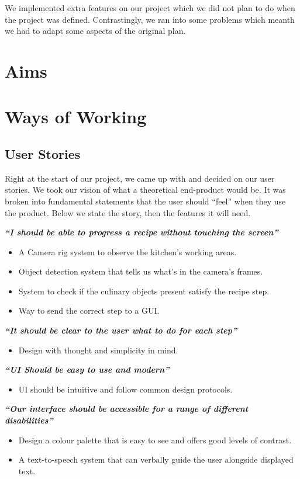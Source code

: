 \documentclass{article}
\begin{document}
We implemented extra features on our project which we did not plan to do when the project was defined. Contrastingly, we ran into some problems which meanth we had to adapt some aspects of the original plan.

    

    \section{Aims}

    \section{Ways of Working}
    \subsection{User Stories}
    Right at the start of our project, we came up with and decided on our user stories. We took our vision of what a theoretical end-product would be. It was broken into fundamental statements that the user should “feel” when they use the product. Below we state the story, then the features it will need.

    \begin{center}
        \textbf{\textit{“I should be able to progress a recipe without touching the screen”}}
        \begin{itemize}
            \item A Camera rig system to observe the kitchen's working areas.
            \item Object detection system that tells us what’s in the camera's frames. 
            \item System to check if the culinary objects present satisfy the recipe step.
            \item Way to send the correct step to a GUI.
        \end{itemize}
        
        \textbf{\textit{“It should be clear to the user what to do for each step”}}
        \begin{itemize}
            \item Design with thought and simplicity in mind.
        \end{itemize}
        \textbf{\textit{“UI Should be easy to use and modern”}}
        \begin{itemize}
            \item UI should be intuitive and follow common design protocols.
        \end{itemize}
        
        \textbf{\textit{“Our interface should be accessible for a range of different disabilities”}}
        \begin{itemize}
            \item Design a colour palette that is easy to see and offers good levels of contrast.
            \item A text-to-speech system that can verbally guide the user alongside displayed text.
        \end{itemize}
        
    \end{center}
\end{document}
